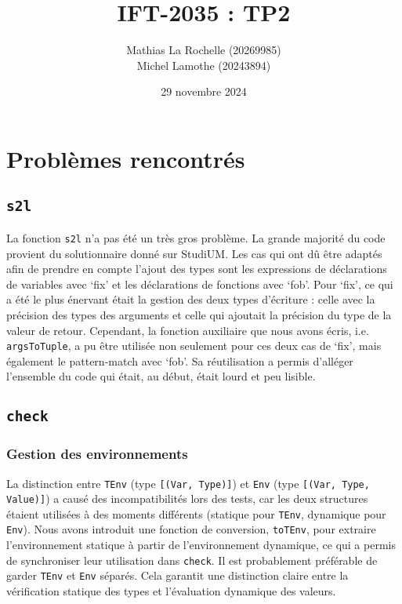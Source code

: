 \documentclass[a4paper,12pt]{article}
\title{IFT-2035 : TP2}
\author{
    Mathias La Rochelle (20269985) \\ 
    Michel Lamothe (20243894)
}
\date{29 novembre 2024}
\begin{document}
\maketitle

\vspace{2em}
\pagestyle{plain} %
\tableofcontents
\newpage
\pagestyle{fancy} %

\section{Problèmes rencontrés}
    \subsection{\texttt{s2l}}
        La fonction \texttt{s2l} n'a pas été un très gros problème. La grande majorité du code
        provient du solutionnaire donné sur StudiUM. Les cas qui ont dû être adaptés afin de 
        prendre en compte l'ajout des types sont les expressions de déclarations de variables
        avec `fix' et les déclarations de fonctions avec `fob'. Pour `fix', ce qui a été le 
        plus énervant était la gestion des deux types d'écriture : celle avec la précision
        des types des arguments et celle qui ajoutait la précision du type de la valeur de 
        retour. Cependant, la fonction auxiliaire que nous avons écris, i.e. \texttt{argsToTuple}, 
        a pu être utilisée non seulement pour ces deux cas de `fix', mais également le 
        pattern-match avec `fob'. Sa réutilisation a permis d'alléger l'ensemble du code qui
        était, au début, était lourd et peu lisible.
    \subsection{\texttt{check}}
    \subsubsection{Gestion des environnements}
    La distinction entre \texttt{TEnv} (type \texttt{[(Var, Type)]}) et \texttt{Env} (type \texttt{[(Var, Type, Value)]}) a causé des incompatibilités lors des tests, car les deux structures étaient utilisées à des moments différents (statique pour \texttt{TEnv}, dynamique pour \texttt{Env}). Nous avons introduit une fonction de conversion, \texttt{toTEnv}, pour extraire l’environnement statique à partir de l’environnement dynamique, ce qui a permis de synchroniser leur utilisation dans \texttt{check}. Il est probablement préférable de garder \texttt{TEnv} et \texttt{Env} séparés. Cela garantit une distinction claire entre la vérification statique des types et l'évaluation dynamique des valeurs.
\end{document}

